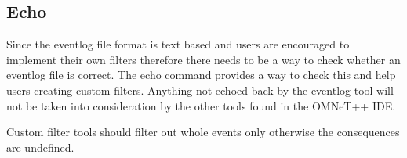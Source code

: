\subsection{Echo}
Since the eventlog file format is text based and users are encouraged
to implement their own filters therefore there needs to be a way to
check whether an eventlog file is correct. The echo command provides a
way to check this and help users creating custom filters. Anything not
echoed back by the eventlog tool will not be taken into consideration
by the other tools found in the OMNeT++ IDE.
\begin{note}
Custom filter tools should filter out whole events only otherwise the
consequences are undefined.
\end{note}

